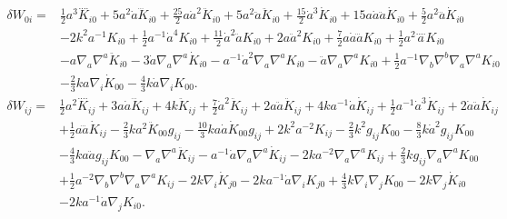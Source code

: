 \documentclass[10pt,letterpaper]{article}
\begin{document}
\begin{align}
\delta W_{0i}={}&\tfrac{1}{2} a^3 \overset{\text{...}.}{K}_{i0}
 + 5 a^2 \dot{a} \dddot{K}_{i0}
 + \tfrac{25}{2} a \dot{a}^2 \ddot{K}_{i0}
 + 5 a^2 \ddot{a} \ddot{K}_{i0}
 + \tfrac{15}{2} \dot{a}^3 \dot{K}_{i0}
 + 15 a \dot{a} \ddot{a} \dot{K}_{i0}
 + \tfrac{5}{2} a^2 \dddot{a} \dot{K}_{i0}\nonumber\\
& - 2 k^2 a^{-1} K_{i0}
 + \tfrac{1}{2} a^{-1} \dot{a}^4 K_{i0}
 + \tfrac{11}{2} \dot{a}^2 \ddot{a} K_{i0}
 + 2 a \ddot{a}^2 K_{i0}
 + \tfrac{7}{2} a \dot{a} \dddot{a} K_{i0}
 + \tfrac{1}{2} a^2 \overset{\text{...}.}{a} K_{i0}\nonumber\\
& -  a \nabla_{a}\nabla^{a}\ddot{K}_{i0}
 - 3 \dot{a} \nabla_{a}\nabla^{a}\dot{K}_{i0}
 -  a^{-1} \dot{a}^2 \nabla_{a}\nabla^{a}K_{i0}
 -  \ddot{a} \nabla_{a}\nabla^{a}K_{i0}
 + \tfrac{1}{2} a^{-1} \nabla_{b}\nabla^{b}\nabla_{a}\nabla^{a}K_{i0}\nonumber\\
& -  \tfrac{2}{3} k a \nabla_{i}\dot{K}_{00}
 -  \tfrac{4}{3} k \dot{a} \nabla_{i}K_{00}.
\end{align}
\begin{align}
\delta W_{ij}={}&\tfrac{1}{2} a^2 \overset{\text{...}.}{K}_{ij}
 + 3 a \dot{a} \dddot{K}_{ij}
 + 4 k \ddot{K}_{ij}
 + \tfrac{7}{2} \dot{a}^2 \ddot{K}_{ij}
 + 2 a \ddot{a} \ddot{K}_{ij}
 + 4 k a^{-1} \dot{a} \dot{K}_{ij}
 + \tfrac{1}{2} a^{-1} \dot{a}^3 \dot{K}_{ij}
 + 2 \dot{a} \ddot{a} \dot{K}_{ij}\nonumber\\
& + \tfrac{1}{2} a \dddot{a} \dot{K}_{ij}
 -  \tfrac{2}{3} k a^2 \ddot{K}_{00} g_{ij}
 -  \tfrac{10}{3} k a \dot{a} \dot{K}_{00} g_{ij}
 + 2 k^2 a^{-2} K_{ij}
 -  \tfrac{2}{3} k^2 g_{ij} K_{00}
 -  \tfrac{8}{3} k \dot{a}^2 g_{ij} K_{00}\nonumber\\
& -  \tfrac{4}{3} k a \ddot{a} g_{ij} K_{00}
 -  \nabla_{a}\nabla^{a}\ddot{K}_{ij}
 -  a^{-1} \dot{a} \nabla_{a}\nabla^{a}\dot{K}_{ij}
 - 2 k a^{-2} \nabla_{a}\nabla^{a}K_{ij}
 + \tfrac{2}{3} k g_{ij} \nabla_{a}\nabla^{a}K_{00}\nonumber\\
& + \tfrac{1}{2} a^{-2} \nabla_{b}\nabla^{b}\nabla_{a}\nabla^{a}K_{ij}
 - 2 k \nabla_{i}\dot{K}_{j0}
 - 2 k a^{-1} \dot{a} \nabla_{i}K_{j0}
 + \tfrac{4}{3} k \nabla_{i}\nabla_{j}K_{00}
 - 2 k \nabla_{j}\dot{K}_{i0}\nonumber\\
& - 2 k a^{-1} \dot{a} \nabla_{j}K_{i0}.
\end{align}
\end{document}
